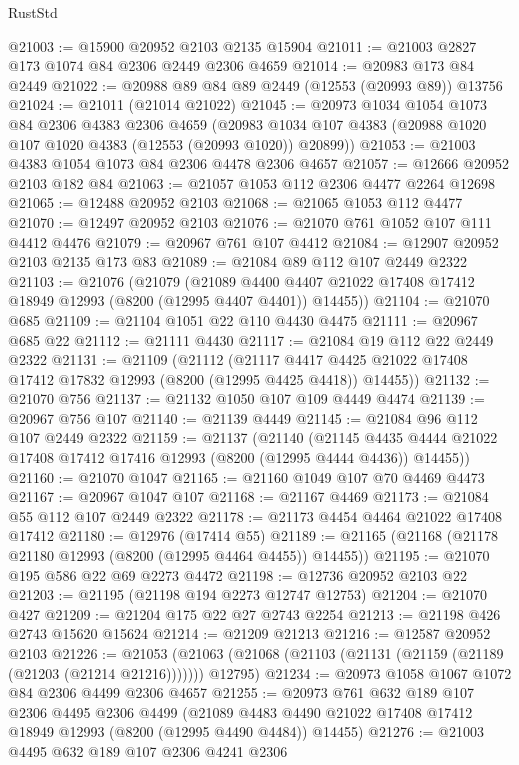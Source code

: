 \begin{lexlean}{RustStd}
\begin{coremodule}
@21003 := @15900 @20952 @2103 @2135 @15904
@21011 := @21003 @2827 @173 @1074 @84 @2306 @2449 @2306 @4659
@21014 := @20983 @173 @84 @2449
@21022 := @20988 @89 @84 @89 @2449 (@12553 (@20993 @89)) @13756
@21024 := @21011 (@21014 @21022)
@21045 := @20973
    @1034
    @1054
    @1073
    @84
    @2306
    @4383
    @2306
    @4659
    (@20983 @1034 @107 @4383 (@20988 @1020 @107 @1020 @4383 (@12553 (@20993 @1020)) @20899))
@21053 := @21003 @4383 @1054 @1073 @84 @2306 @4478 @2306 @4657
@21057 := @12666 @20952 @2103 @182 @84
@21063 := @21057 @1053 @112 @2306 @4477 @2264 @12698
@21065 := @12488 @20952 @2103
@21068 := @21065 @1053 @112 @4477
@21070 := @12497 @20952 @2103
@21076 := @21070 @761 @1052 @107 @111 @4412 @4476
@21079 := @20967 @761 @107 @4412
@21084 := @12907 @20952 @2103 @2135 @173 @83
@21089 := @21084 @89 @112 @107 @2449 @2322
@21103 := @21076
    (@21079
      (@21089 @4400 @4407 @21022 @17408 @17412 @18949 @12993 (@8200 (@12995 @4407 @4401)) @14455))
@21104 := @21070 @685
@21109 := @21104 @1051 @22 @110 @4430 @4475
@21111 := @20967 @685 @22
@21112 := @21111 @4430
@21117 := @21084 @19 @112 @22 @2449 @2322
@21131 := @21109
    (@21112
      (@21117 @4417 @4425 @21022 @17408 @17412 @17832 @12993 (@8200 (@12995 @4425 @4418)) @14455))
@21132 := @21070 @756
@21137 := @21132 @1050 @107 @109 @4449 @4474
@21139 := @20967 @756 @107
@21140 := @21139 @4449
@21145 := @21084 @96 @112 @107 @2449 @2322
@21159 := @21137
    (@21140
      (@21145 @4435 @4444 @21022 @17408 @17412 @17416 @12993 (@8200 (@12995 @4444 @4436)) @14455))
@21160 := @21070 @1047
@21165 := @21160 @1049 @107 @70 @4469 @4473
@21167 := @20967 @1047 @107
@21168 := @21167 @4469
@21173 := @21084 @55 @112 @107 @2449 @2322
@21178 := @21173 @4454 @4464 @21022 @17408 @17412
@21180 := @12976 (@17414 @55)
@21189 := @21165 (@21168 (@21178 @21180 @12993 (@8200 (@12995 @4464 @4455)) @14455))
@21195 := @21070 @195 @586 @22 @69 @2273 @4472
@21198 := @12736 @20952 @2103 @22
@21203 := @21195 (@21198 @194 @2273 @12747 @12753)
@21204 := @21070 @427
@21209 := @21204 @175 @22 @27 @2743 @2254
@21213 := @21198 @426 @2743 @15620 @15624
@21214 := @21209 @21213
@21216 := @12587 @20952 @2103
@21226 := @21053
    (@21063 (@21068 (@21103 (@21131 (@21159 (@21189 (@21203 (@21214 @21216))))))) @12795)
@21234 := @20973 @1058 @1067 @1072 @84 @2306 @4499 @2306 @4657
@21255 := @20973
    @761
    @632
    @189
    @107
    @2306
    @4495
    @2306
    @4499
    (@21089 @4483 @4490 @21022 @17408 @17412 @18949 @12993 (@8200 (@12995 @4490 @4484)) @14455)
@21276 := @21003
    @4495
    @632
    @189
    @107
    @2306
    @4241
    @2306

\end{coremodule}
\end{lexlean}
